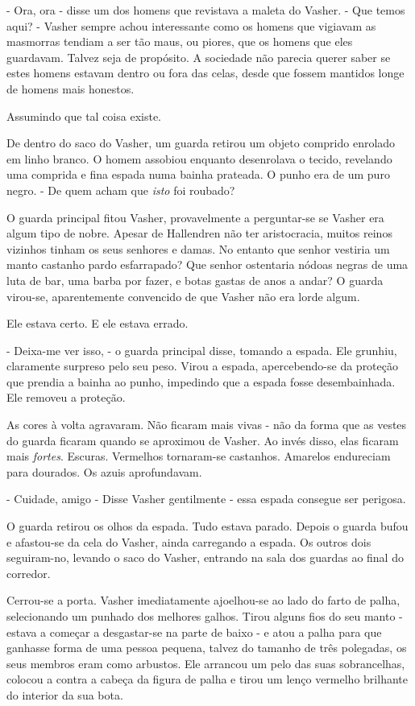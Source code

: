 \documentclass[11pt,a4paper]{book}
\begin{document}
- Ora, ora - disse um dos homens que revistava a maleta do Vasher. - Que temos aqui? - Vasher sempre achou interessante como os homens que vigiavam as masmorras tendiam a ser tão maus, ou piores, que os homens que eles guardavam. Talvez seja de propósito. A sociedade não parecia querer saber se estes homens estavam dentro ou fora das celas, desde que fossem mantidos longe de homens mais honestos.

Assumindo que tal coisa existe.

De dentro do saco do Vasher, um guarda retirou um objeto comprido enrolado em linho branco. O homem assobiou enquanto desenrolava o tecido, revelando uma comprida e fina espada numa bainha prateada. O punho era de um puro negro. 
- De quem acham que \textit{isto} foi roubado?
 
O guarda principal fitou Vasher, provavelmente a perguntar-se se Vasher era algum tipo de nobre. Apesar de Hallendren não ter aristocracia, muitos reinos vizinhos tinham os seus senhores e damas. No entanto que senhor vestiria um manto castanho pardo esfarrapado? Que senhor ostentaria nódoas negras de uma luta de bar, uma barba por fazer, e botas gastas de anos a andar? O guarda virou-se, aparentemente convencido de que Vasher não era lorde algum.

Ele estava certo. E ele estava errado.

- Deixa-me ver isso, - o guarda principal disse, tomando a espada. Ele grunhiu, claramente surpreso pelo seu peso. Virou a espada, apercebendo-se da proteção que prendia a bainha ao punho, impedindo que a espada fosse desembainhada. Ele removeu a proteção.

As cores à volta agravaram. Não ficaram mais vivas - não da forma que as vestes do guarda ficaram quando se aproximou de Vasher. Ao invés disso, elas ficaram mais \textit{fortes}. Escuras. Vermelhos tornaram-se castanhos. Amarelos endureciam para dourados. Os azuis aprofundavam.

- Cuidade, amigo - Disse Vasher gentilmente - essa espada consegue ser perigosa.

O guarda retirou os olhos da espada. Tudo estava parado. Depois o guarda bufou e afastou-se da cela do Vasher, ainda carregando a espada. Os outros dois seguiram-no, levando o saco do Vasher, entrando na sala dos guardas ao final do corredor. 

Cerrou-se a porta. Vasher imediatamente ajoelhou-se ao lado do farto de palha, selecionando um punhado dos melhores galhos. Tirou alguns fios do seu manto - estava a começar a desgastar-se na parte de baixo - e atou a palha para que ganhasse forma de uma pessoa pequena, talvez do tamanho de três polegadas, os seus membros eram como arbustos. Ele arrancou um pelo das suas sobrancelhas, colocou a contra a cabeça da figura de palha e tirou um lenço vermelho brilhante do interior da sua bota.
\end{document}
